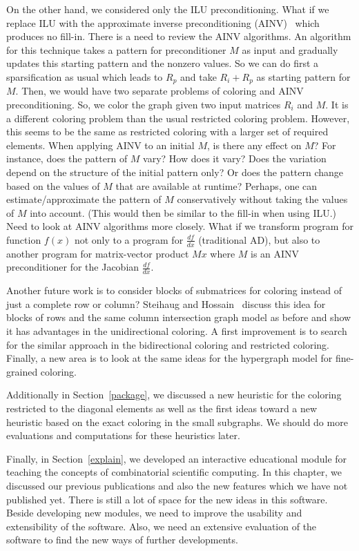 \documentclass[12pt, twoside,a4paper,toc=bibliography]{scrbook}
\newcommand{\secref}[1]{Section~\protect\ref{#1}}
\begin{document}
On the other hand, we considered only the ILU preconditioning. What if we replace ILU with the approximate inverse preconditioning (AINV)~\cite{ainv98} which produces no fill-in. There is a need to review the AINV algorithms. An algorithm for this technique takes a pattern for preconditioner $M$ as input and gradually updates this starting pattern and the nonzero values.
So we can do first a sparsification as usual which leads to $R_p$ and take $R_i + R_p$ as starting pattern for $M$. Then, we would have two separate problems of coloring and AINV preconditioning.
So, we color the graph given two input matrices $R_i$ and $M$.
It is a different coloring problem than the usual restricted coloring problem.
However, this seems to be the same as restricted coloring with a larger set of required elements.
When applying AINV to an initial $M$, is there any effect on $M$? For
instance, does the pattern of $M$ vary? How does it vary? Does the
variation depend on the structure of the initial pattern only? Or
does the pattern change based on the values of $M$ that are available
at runtime? Perhaps, one can estimate/approximate the pattern of $M$
conservatively without taking the values of $M$ into account. (This
would then be similar to the fill-in when using ILU.) Need to look
at AINV algorithms more closely.
What if we transform program for function $f(x)$ not only to a program for $\frac{df}{dx}$ (traditional AD),
but also to another program for matrix-vector product $Mx$ where $M$ is an AINV preconditioner for the Jacobian $\frac{df}{dx}$.

Another future work is to consider blocks of submatrices for coloring instead of just a complete row or column? Steihaug and Hossain~\cite{Steihaug1997GCa} discuss this idea for blocks of rows and the same column intersection graph model as before and show it has advantages in the unidirectional coloring. A first improvement is to search for the similar approach in the bidirectional coloring and restricted coloring. Finally, a new area is to look at the same ideas for the hypergraph model for fine-grained coloring.

Additionally in \secref{package}, we discussed a new heuristic for the coloring restricted to the diagonal elements
as well as the first ideas toward a new heuristic based on the exact coloring in the small subgraphs.
We should do more evaluations and computations for these heuristics later.

Finally, in \secref{explain}, we developed an interactive educational module 
for teaching the concepts of combinatorial scientific computing. 
In this chapter, we discussed our previous publications
\cite{2013:05,2014:01,2014:02,2014:09,2015:3} and also the new features which 
we have not published yet. There is still a lot of space 
for the new ideas in this software. Beside developing new modules,
we need to improve the usability and extensibility of the software.
Also, we need an extensive evaluation of the software to find
the new ways of further developments.
\end{document}

